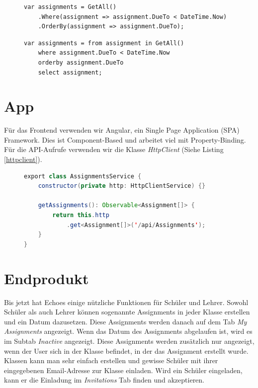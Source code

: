 \documentclass[a4paper, titlepage]{article}
\begin{document}
    \begin{figure}
    \begin{lstlisting}[caption=Lambda-Syntax, label=lambda]
var assignments = GetAll()
    .Where(assignment => assignment.DueTo < DateTime.Now)
    .OrderBy(assignment => assignment.DueTo);
    \end{lstlisting}

    \begin{lstlisting}[caption=Query-Syntax, label=query]
var assignments = from assignment in GetAll()
    where assignment.DueTo < DateTime.Now
    orderby assignment.DueTo
    select assignment;
    \end{lstlisting}
\end{figure}


    \section{App}
    Für das Frontend verwenden wir Angular, ein Single Page Application (SPA) Framework. Dies ist Component-Based
    und arbeitet viel mit Property-Binding. Für die API-Aufrufe verwenden wir die Klasse \emph{HttpClient} (Siehe 
    Listing \ref{httpclient}).

    \begin{figure}
        
    \begin{lstlisting}[language=java,caption=HttpClient, label=httpclient]
export class AssignmentsService {
    constructor(private http: HttpClientService) {}
    
    getAssignments(): Observable<Assignment[]> {
        return this.http
            .get<Assignment[]>('/api/Assignments');
    }
} 

    \end{lstlisting}
    \end{figure}

    \section{Endprodukt}
    Bis jetzt hat Echoes einige nützliche Funktionen für Schüler und Lehrer. Sowohl Schüler als auch Lehrer können sogenannte Assignments 
    in jeder Klasse erstellen und ein Datum dazusetzen. Diese Assignments werden danach auf dem Tab \emph{My Assignments} angezeigt. 
    Wenn das Datum des Assignments abgelaufen ist, wird es im Subtab \emph{Inactive} angezeigt. Diese Assignments werden zusätzlich nur angezeigt, 
    wenn der User sich in der Klasse befindet, in der das Assignment erstellt wurde. Klassen kann man sehr einfach erstellen und gewisse Schüler 
    mit ihrer eingegebenen Email-Adresse zur Klasse einladen. Wird ein Schüler eingeladen, kann er die Einladung im \emph{Invitations} Tab 
    finden und akzeptieren.
    
\end{document}
